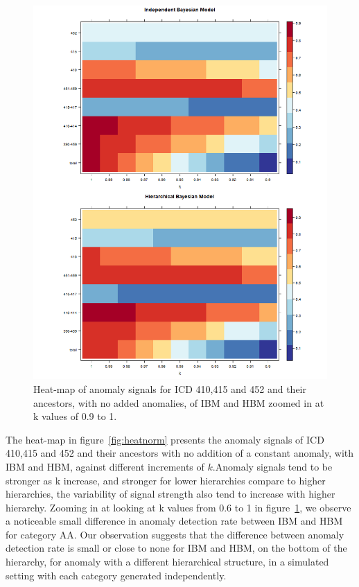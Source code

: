 \begin{figure}[!h]
	\centering
	\includegraphics[width=1\linewidth]{../../R-codes/JAGS/plots/mimic/heatnorm2}
	\caption{Heat-map of anomaly signals for ICD 410,415 and 452 and their ancestors, with no added anomalies, of IBM and HBM zoomed in at k values of 0.9 to 1.}
	\label{fig:heatnorm2}
\end{figure}

\newpage

The heat-map in figure~\ref{fig:heatnorm} presents the anomaly signals of ICD 410,415 and 452 and their ancestors with no addition of a constant anomaly, with IBM and HBM, against different increments of $k$.Anomaly signals tend to be stronger as k increase, and stronger for lower hierarchies compare to higher hierarchies, the variability of signal strength also tend to increase with higher hierarchy. Zooming in at looking at k values from 0.6 to 1 in figure~\ref{fig:heatnorm2}, we observe a noticeable small difference in anomaly detection rate between IBM and HBM for category AA. Our observation suggests that the difference between anomaly detection rate is small or close to none for IBM and HBM, on the bottom of the hierarchy, for anomaly with a different hierarchical structure, in a simulated setting with each category generated independently.   

